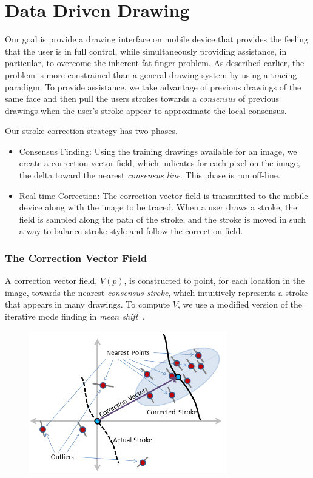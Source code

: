 \section{Data Driven Drawing}

Our goal is provide a drawing interface on mobile device that provides the feeling that the user is in full control, while simultaneously providing assistance, in particular, to overcome the inherent fat finger problem. As described earlier, the problem is more constrained than a general drawing system by using a tracing paradigm. To provide assistance, we take advantage of previous drawings of the same face and then pull the users strokes towards a {\em consensus} of previous drawings when the user's stroke appear to approximate the local consensus.

Our stroke correction strategy has two phases.
\begin{itemize}
\item Consensus Finding: Using the training drawings available for an image, we create a correction vector field, which indicates for each pixel on the image, the delta toward the nearest {\em consensus line}.  This phase is run off-line.
\item Real-time Correction: The correction vector field is transmitted to the mobile device along with the image to be traced.  When a user draws a stroke, the field is sampled along the path of the stroke, and the stroke is moved in such a way to balance stroke style and follow the correction field.
\end{itemize}

\subsubsection{The Correction Vector Field}

A correction vector field, $V(p)$, is constructed to point, for each location in the image, towards the nearest {\em consensus stroke}, which intuitively represents a stroke that appears in many drawings. To compute $V$, we use a modified version of the iterative mode finding in {\em mean shift}~\cite{10.1109/ICCV.1999.790416}.


\begin{figure}
  \centering%
  \includegraphics[width=3.4in]{ellipse.png}
  \caption{  }
  \label{fig:ellipse}
\end{figure}


